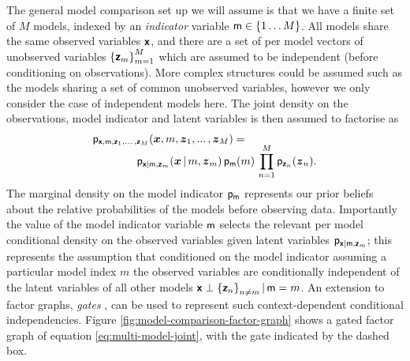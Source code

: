The general model comparison set up we will assume is that we have a finite set of $M$ models, indexed by an \emph{indicator} variable $\rvar{m} \in \fset{1 \dots M}$. All models share the same observed variables  $\boldsymbol{\mathsf{x}}$, and there are a set of per model vectors of unobserved variables $\fset{\rvct{z}_m}_{m=1}^M$ which are assumed to be independent (before conditioning on observations). More complex structures could be assumed such as the models sharing a set of common unobserved variables, however we only consider the case of independent models here. The joint density on the observations, model indicator and latent variables is then assumed to factorise as
\begin{equation}\label{eq:multi-model-joint}
\begin{split}
  &\mathsf{p}_{\boldsymbol{\mathsf{x}},\mathsf{m},\boldsymbol{\mathsf{z}}_1,...\, ,\boldsymbol{\mathsf{z}}_M}
  (\boldsymbol{x},m,\boldsymbol{z}_1,...\, ,\boldsymbol{z}_M) =\\[-2mm]
  &\qquad\qquad
  \mathsf{p}_{\boldsymbol{\mathsf{x}}|\mathsf{m},\boldsymbol{\mathsf{z}}_m}(\boldsymbol{x}\operatorname{|} m,\boldsymbol{z}_m)\,
  \mathsf{p}_{\mathsf{m}}(m)\,
  \prod_{n=1}^M \mathsf{p}_{\boldsymbol{\mathsf{z}}_n}(\boldsymbol{z}_n).
\end{split}
\end{equation}
The marginal density on the model indicator $\mathsf{p}_{\mathsf{m}}$ represents our prior beliefs about the relative probabilities of the models before observing data. Importantly the value of the model indicator variable $\mathsf{m}$ selects the relevant per model conditional density on the observed variables given latent variables $\mathsf{p}_{\boldsymbol{\mathsf{x}}|\mathsf{m},\boldsymbol{\mathsf{z}}_m}$; this represents the assumption that conditioned on the model indicator assuming a particular model index $m$ the observed variables are conditionally independent of the latent variables of all other models $\rvct{x} \perp \fset{\rvct{z}_n}_{n\neq m} \gvn \rvar{m} = m$. An extension to factor graphs, \emph{gates} \citep{minka2009gates}, can be used to represent such context-dependent conditional independencies. Figure \ref{fig:model-comparison-factor-graph} shows a gated factor graph of equation \ref{eq:multi-model-joint}, with the gate indicated by the dashed box. %

